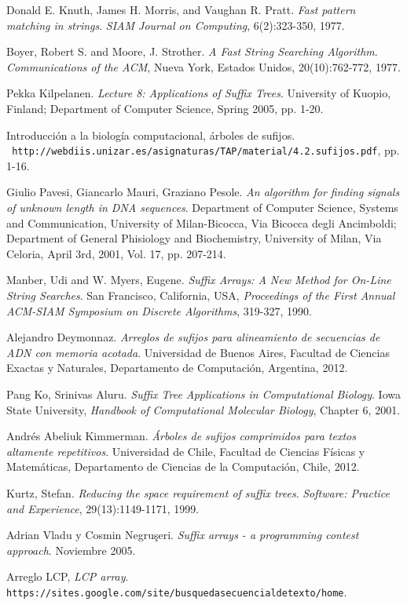 \documentclass[letterpaper, 12pt, notitlepage]{report}
\newlength{\defbaselineskip}
\newcommand{\singlespacing}{\setlength{\baselineskip}{\defbaselineskip}}
\begin{document}
\begin{thebibliography}{9}
Donald E. Knuth, James H. Morris, and Vaughan R. Pratt.
\textit{Fast pattern matching in strings}.
\textit{SIAM Journal on Computing}, 6(2):323-350, 1977.

Boyer, Robert S. and Moore, J. Strother.
\textit{A Fast String Searching Algorithm}.
\textit{Communications of the ACM}, Nueva York, Estados Unidos, 20(10):762-772, 1977.

Pekka Kilpelanen.
\textit{Lecture 8: Applications of Suffix Trees}. 
University of Kuopio, Finland; Department of Computer Science, Spring 2005, pp. 1-20.


Introducción a la biología computacional, árboles de sufijos.
\\\texttt{ http://webdiis.unizar.es/asignaturas/TAP/material/4.2.sufijos.pdf}, pp. 1-16.

 
Giulio Pavesi, Giancarlo Mauri, Graziano Pesole.
\textit{An algorithm for finding signals of unknown length in DNA sequences}. 
Department of Computer Science, Systems and Communication, University of Milan-Bicocca, Via Bicocca degli Ancimboldi; Department of General Phisiology and Biochemistry, University of Milan, Via Celoria, April 3rd, 2001, Vol. 17, pp. 207-214.

Manber, Udi and W. Myers, Eugene.
\textit{Suffix Arrays: A New Method for On-Line String Searches}. San Francisco, California, USA, 
\textit{Proceedings of the First Annual ACM-SIAM Symposium on Discrete Algorithms}, 319-327, 1990.

Alejandro Deymonnaz.
\textit{Arreglos de sufijos para alineamiento de secuencias de ADN con memoria acotada}. Universidad de Buenos Aires, Facultad de Ciencias Exactas y Naturales, Departamento de Computación, Argentina, 2012.

Pang Ko, Srinivas Aluru.
\textit{Suffix Tree Applications in Computational Biology}. 
Iowa State University, \textit{Handbook of Computational Molecular Biology}, Chapter 6, 2001.

Andrés Abeliuk Kimmerman.
\textit{Árboles de sufijos comprimidos para textos altamente repetitivos}. Universidad de Chile, Facultad de Ciencias Físicas y Matemáticas, Departamento de Ciencias de la Computación, Chile, 2012.

Kurtz, Stefan.
\textit{Reducing the space requirement of suffix trees}.
\textit{Software: Practice and Experience}, 29(13):1149-1171, 1999.

Adrian Vladu y Cosmin Negru\c{s}eri.
\textit{Suffix arrays - a programming contest approach}. Noviembre 2005.

Arreglo LCP, \textit{LCP array}.
\\\texttt{https://sites.google.com/site/busquedasecuencialdetexto/home}.


\end{thebibliography}



%




\singlespacing
\cleardoublepage
\end{document}
